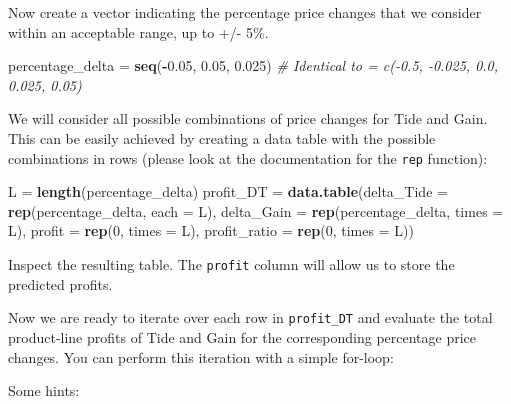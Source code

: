 \documentclass[
]{article}
\newenvironment{Shaded}{\begin{snugshade}}{\end{snugshade}}
\newcommand{\AttributeTok}[1]{\textcolor[rgb]{0.13,0.29,0.53}{#1}}
\newcommand{\CommentTok}[1]{\textcolor[rgb]{0.56,0.35,0.01}{\textit{#1}}}
\newcommand{\DecValTok}[1]{\textcolor[rgb]{0.00,0.00,0.81}{#1}}
\newcommand{\FloatTok}[1]{\textcolor[rgb]{0.00,0.00,0.81}{#1}}
\newcommand{\FunctionTok}[1]{\textcolor[rgb]{0.13,0.29,0.53}{\textbf{#1}}}
\newcommand{\NormalTok}[1]{#1}
\newcommand{\OtherTok}[1]{\textcolor[rgb]{0.56,0.35,0.01}{#1}}
\newcommand{\SpecialCharTok}[1]{\textcolor[rgb]{0.81,0.36,0.00}{\textbf{#1}}}
\begin{document}
\bigskip

Now create a vector indicating the percentage price changes that we
consider within an acceptable range, up to +/- 5\%.

\begin{Shaded}
\begin{Highlighting}[]
\NormalTok{percentage\_delta }\OtherTok{=} \FunctionTok{seq}\NormalTok{(}\SpecialCharTok{{-}}\FloatTok{0.05}\NormalTok{, }\FloatTok{0.05}\NormalTok{, }\FloatTok{0.025}\NormalTok{)    }\CommentTok{\# Identical to = c({-}0.5, {-}0.025, 0.0, 0.025, 0.05)}
\end{Highlighting}
\end{Shaded}

\bigskip

We will consider all possible combinations of price changes for Tide and
Gain. This can be easily achieved by creating a data table with the
possible combinations in rows (please look at the documentation for the
\texttt{rep} function):

\begin{Shaded}
\begin{Highlighting}[]
\NormalTok{L }\OtherTok{=} \FunctionTok{length}\NormalTok{(percentage\_delta)}
\NormalTok{profit\_DT }\OtherTok{=} \FunctionTok{data.table}\NormalTok{(}\AttributeTok{delta\_Tide =} \FunctionTok{rep}\NormalTok{(percentage\_delta, }\AttributeTok{each =}\NormalTok{ L),}
                       \AttributeTok{delta\_Gain =} \FunctionTok{rep}\NormalTok{(percentage\_delta, }\AttributeTok{times =}\NormalTok{ L),}
                       \AttributeTok{profit     =} \FunctionTok{rep}\NormalTok{(}\DecValTok{0}\NormalTok{, }\AttributeTok{times =}\NormalTok{ L),}
                       \AttributeTok{profit\_ratio =} \FunctionTok{rep}\NormalTok{(}\DecValTok{0}\NormalTok{, }\AttributeTok{times =}\NormalTok{ L))}
\end{Highlighting}
\end{Shaded}

Inspect the resulting table. The \texttt{profit} column will allow us to
store the predicted profits.

\bigskip

Now we are ready to iterate over each row in \texttt{profit\_DT} and
evaluate the total product-line profits of Tide and Gain for the
corresponding percentage price changes. You can perform this iteration
with a simple for-loop:

\medskip

Some hints:
\end{document}
